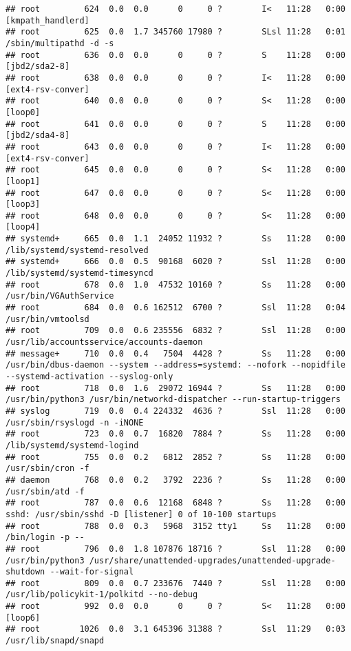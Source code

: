 \documentclass[]{article}
\begin{document}
\begin{verbatim}
## root         624  0.0  0.0      0     0 ?        I<   11:28   0:00 [kmpath_handlerd]
## root         625  0.0  1.7 345760 17980 ?        SLsl 11:28   0:01 /sbin/multipathd -d -s
## root         636  0.0  0.0      0     0 ?        S    11:28   0:00 [jbd2/sda2-8]
## root         638  0.0  0.0      0     0 ?        I<   11:28   0:00 [ext4-rsv-conver]
## root         640  0.0  0.0      0     0 ?        S<   11:28   0:00 [loop0]
## root         641  0.0  0.0      0     0 ?        S    11:28   0:00 [jbd2/sda4-8]
## root         643  0.0  0.0      0     0 ?        I<   11:28   0:00 [ext4-rsv-conver]
## root         645  0.0  0.0      0     0 ?        S<   11:28   0:00 [loop1]
## root         647  0.0  0.0      0     0 ?        S<   11:28   0:00 [loop3]
## root         648  0.0  0.0      0     0 ?        S<   11:28   0:00 [loop4]
## systemd+     665  0.0  1.1  24052 11932 ?        Ss   11:28   0:00 /lib/systemd/systemd-resolved
## systemd+     666  0.0  0.5  90168  6020 ?        Ssl  11:28   0:00 /lib/systemd/systemd-timesyncd
## root         678  0.0  1.0  47532 10160 ?        Ss   11:28   0:00 /usr/bin/VGAuthService
## root         684  0.0  0.6 162512  6700 ?        Ssl  11:28   0:04 /usr/bin/vmtoolsd
## root         709  0.0  0.6 235556  6832 ?        Ssl  11:28   0:00 /usr/lib/accountsservice/accounts-daemon
## message+     710  0.0  0.4   7504  4428 ?        Ss   11:28   0:00 /usr/bin/dbus-daemon --system --address=systemd: --nofork --nopidfile --systemd-activation --syslog-only
## root         718  0.0  1.6  29072 16944 ?        Ss   11:28   0:00 /usr/bin/python3 /usr/bin/networkd-dispatcher --run-startup-triggers
## syslog       719  0.0  0.4 224332  4636 ?        Ssl  11:28   0:00 /usr/sbin/rsyslogd -n -iNONE
## root         723  0.0  0.7  16820  7884 ?        Ss   11:28   0:00 /lib/systemd/systemd-logind
## root         755  0.0  0.2   6812  2852 ?        Ss   11:28   0:00 /usr/sbin/cron -f
## daemon       768  0.0  0.2   3792  2236 ?        Ss   11:28   0:00 /usr/sbin/atd -f
## root         787  0.0  0.6  12168  6848 ?        Ss   11:28   0:00 sshd: /usr/sbin/sshd -D [listener] 0 of 10-100 startups
## root         788  0.0  0.3   5968  3152 tty1     Ss   11:28   0:00 /bin/login -p --
## root         796  0.0  1.8 107876 18716 ?        Ssl  11:28   0:00 /usr/bin/python3 /usr/share/unattended-upgrades/unattended-upgrade-shutdown --wait-for-signal
## root         809  0.0  0.7 233676  7440 ?        Ssl  11:28   0:00 /usr/lib/policykit-1/polkitd --no-debug
## root         992  0.0  0.0      0     0 ?        S<   11:28   0:00 [loop6]
## root        1026  0.0  3.1 645396 31388 ?        Ssl  11:29   0:03 /usr/lib/snapd/snapd

\end{verbatim}
\end{document}
